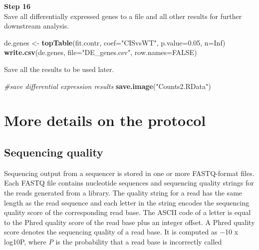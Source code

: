 \documentclass[]{book}
\newenvironment{Shaded}{\begin{snugshade}}{\end{snugshade}}
\newcommand{\CommentTok}[1]{\textcolor[rgb]{0.56,0.35,0.01}{\textit{#1}}}
\newcommand{\DataTypeTok}[1]{\textcolor[rgb]{0.13,0.29,0.53}{#1}}
\newcommand{\FloatTok}[1]{\textcolor[rgb]{0.00,0.00,0.81}{#1}}
\newcommand{\KeywordTok}[1]{\textcolor[rgb]{0.13,0.29,0.53}{\textbf{#1}}}
\newcommand{\NormalTok}[1]{#1}
\newcommand{\OtherTok}[1]{\textcolor[rgb]{0.56,0.35,0.01}{#1}}
\newcommand{\StringTok}[1]{\textcolor[rgb]{0.31,0.60,0.02}{#1}}
\begin{document}
\textbf{Step 16}\\

Save all differentially expressed genes to a file and all other results for further downstream analysis.

\begin{Shaded}
\begin{Highlighting}[]
\NormalTok{de.genes <-}\StringTok{ }\KeywordTok{topTable}\NormalTok{(fit.contr, }\DataTypeTok{coef=}\StringTok{"CISvsWT"}\NormalTok{, }\DataTypeTok{p.value=}\FloatTok{0.05}\NormalTok{, }\DataTypeTok{n=}\OtherTok{Inf}\NormalTok{)}
\KeywordTok{write.csv}\NormalTok{(de.genes, }\DataTypeTok{file=}\StringTok{"DE_genes.csv"}\NormalTok{, }\DataTypeTok{row.names=}\OtherTok{FALSE}\NormalTok{)}
\end{Highlighting}
\end{Shaded}

Save all the results to be used later.

\begin{Shaded}
\begin{Highlighting}[]
\CommentTok{#save differential expression results}
\KeywordTok{save.image}\NormalTok{(}\StringTok{"Counts2.RData"}\NormalTok{)}
\end{Highlighting}
\end{Shaded}

\hypertarget{more-details-on-the-protocol}{%
\chapter{More details on the protocol}\label{more-details-on-the-protocol}}

\hypertarget{sequencing-quality}{%
\section{Sequencing quality}\label{sequencing-quality}}

Sequencing output from a sequencer is stored in one or more FASTQ-format files. Each FASTQ
file contains nucleotide sequences and sequencing quality strings for the reads generated from a
library. The quality string for a read has the same length as the read sequence and each letter in the string encodes the sequencing quality score of the corresponding read base. The ASCII code of a letter is equal to the Phred quality score of the read base plus an integer offset.
A Phred quality score denotes the sequencing quality of a read base. It is computed as −10 x log10P, where \emph{P} is the probability that a read base is incorrectly called
\end{document}
